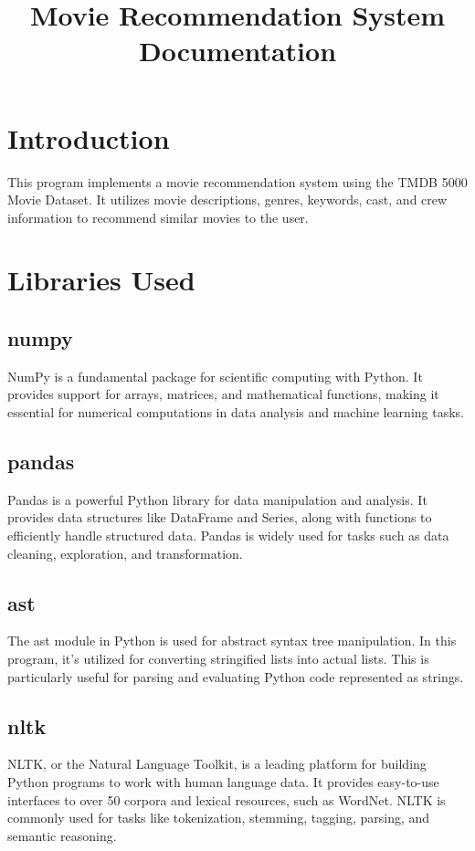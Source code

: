 \documentclass{article}
\title{Movie Recommendation System Documentation}
\begin{document}
\maketitle

\tableofcontents
\newpage

\section{Introduction}
This program implements a movie recommendation system using the TMDB 5000 Movie Dataset. It utilizes movie descriptions, genres, keywords, cast, and crew information to recommend similar movies to the user.

\section{Libraries Used}
\subsection{numpy}
NumPy is a fundamental package for scientific computing with Python. It provides support for arrays, matrices, and mathematical functions, making it essential for numerical computations in data analysis and machine learning tasks.

\subsection{pandas}
Pandas is a powerful Python library for data manipulation and analysis. It provides data structures like DataFrame and Series, along with functions to efficiently handle structured data. Pandas is widely used for tasks such as data cleaning, exploration, and transformation.

\subsection{ast}
The ast module in Python is used for abstract syntax tree manipulation. In this program, it's utilized for converting stringified lists into actual lists. This is particularly useful for parsing and evaluating Python code represented as strings.

\subsection{nltk}
NLTK, or the Natural Language Toolkit, is a leading platform for building Python programs to work with human language data. It provides easy-to-use interfaces to over 50 corpora and lexical resources, such as WordNet. NLTK is commonly used for tasks like tokenization, stemming, tagging, parsing, and semantic reasoning.
\end{document}
